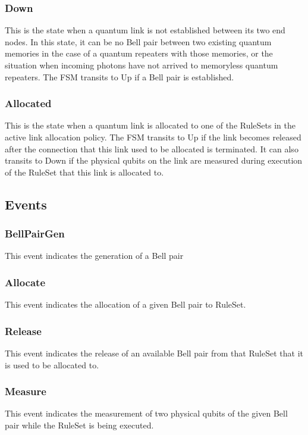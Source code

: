 \subsubsection{Down}
This is the state when a quantum link is not established between its two end nodes. In this state, it can be no Bell pair between two existing quantum memories in the case of a quantum repeaters with those memories, or the situation when incoming photons have not arrived to memoryless quantum repeaters.
The FSM transits to Up if a Bell pair is established.

\subsubsection{Allocated}
This is the state when a quantum link is allocated to one of the RuleSets in the active link allocation policy.
The FSM transits to Up if the link becomes released after the connection that this link used to be allocated is terminated.
It can also transits to Down if the physical qubits on the link are measured during execution of the RuleSet that this link is allocated to.

\subsection{Events}

\subsubsection{BellPairGen}
This event indicates the generation of a Bell pair

\subsubsection{Allocate}
This event indicates the allocation of a given Bell pair to RuleSet.

\subsubsection{Release}
This event indicates the release of an available Bell pair from that RuleSet that it is used to be allocated to.

\subsubsection{Measure}
This event indicates the measurement of two physical qubits of the given Bell pair while the RuleSet is being executed.

